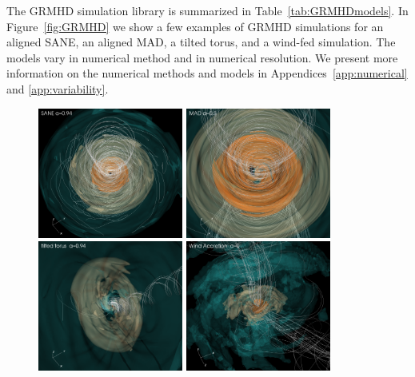 The GRMHD simulation library is summarized in Table~\ref{tab:GRMHDmodels}.
In Figure~\ref{fig:GRMHD} we show a few examples of GRMHD simulations for an aligned SANE, an aligned MAD, a tilted torus, and a wind-fed simulation.
The models vary in numerical method and in numerical resolution. We present more information on the numerical methods and models in Appendices~\ref{app:numerical} and \ref{app:variability}.

\begin{figure}
  \centering
  \includegraphics[width=0.425\textwidth]{figures/sane_3D_corrected.png}\hspace{1.5pt}%
  \includegraphics[width=0.425\textwidth]{figures/mad_3D_corrected.png}\\
  \includegraphics[width=0.425\textwidth]{figures/tilted_3D_corrected.png}\hspace{1.5pt}%
  \includegraphics[width=0.425\textwidth]{figures/ressler_3D_corrected.png}

\end{figure}
